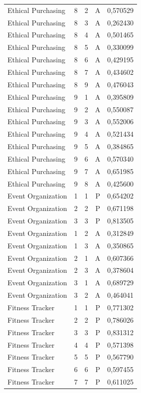 \begin{longtable}{lrrrr}
Ethical Purchasing & 8 & 2 & A & 0,570529 \\
Ethical Purchasing & 8 & 3 & A & 0,262430 \\
Ethical Purchasing & 8 & 4 & A & 0,501465 \\
Ethical Purchasing & 8 & 5 & A & 0,330099 \\
Ethical Purchasing & 8 & 6 & A & 0,429195 \\
Ethical Purchasing & 8 & 7 & A & 0,434602 \\
Ethical Purchasing & 8 & 9 & A & 0,476043 \\
Ethical Purchasing & 9 & 1 & A & 0,395809 \\
Ethical Purchasing & 9 & 2 & A & 0,550087 \\
Ethical Purchasing & 9 & 3 & A & 0,552006 \\
Ethical Purchasing & 9 & 4 & A & 0,521434 \\
Ethical Purchasing & 9 & 5 & A & 0,384865 \\
Ethical Purchasing & 9 & 6 & A & 0,570340 \\
Ethical Purchasing & 9 & 7 & A & 0,651985 \\
Ethical Purchasing & 9 & 8 & A & 0,425600 \\
Event Organization & 1 & 1 & P & 0,654202 \\
Event Organization & 2 & 2 & P & 0,671198 \\
Event Organization & 3 & 3 & P & 0,813505 \\
Event Organization & 1 & 2 & A & 0,312849 \\
Event Organization & 1 & 3 & A & 0,350865 \\
Event Organization & 2 & 1 & A & 0,607366 \\
Event Organization & 2 & 3 & A & 0,378604 \\
Event Organization & 3 & 1 & A & 0,689729 \\
Event Organization & 3 & 2 & A & 0,464041 \\
Fitness Tracker & 1 & 1 & P & 0,771302 \\
Fitness Tracker & 2 & 2 & P & 0,786026 \\
Fitness Tracker & 3 & 3 & P & 0,831312 \\
Fitness Tracker & 4 & 4 & P & 0,571398 \\
Fitness Tracker & 5 & 5 & P & 0,567790 \\
Fitness Tracker & 6 & 6 & P & 0,597455 \\
Fitness Tracker & 7 & 7 & P & 0,611025 \\

\end{longtable}
